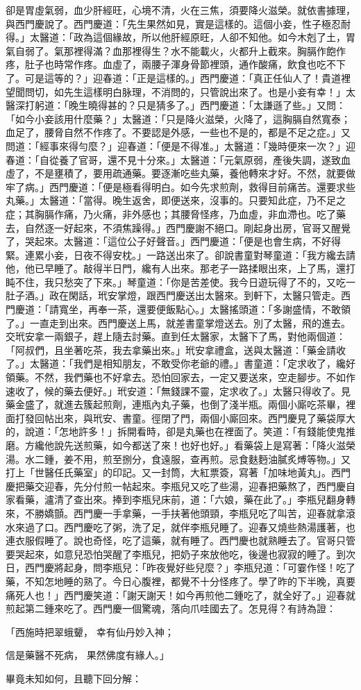 卻是胃虛氣弱，血少肝經旺，心境不清，火在三焦，須要降火滋榮。就依書據理，與西門慶說了。西門慶道：「先生果然如見，實是這樣的。這個小妾，性子極忍耐得。」太醫道：「政為這個緣故，所以他肝經原旺，人卻不知他。如今木剋了土，胃氣自弱了。氣那裡得滿？血那裡得生？水不能載火，火都升上截來。胸膈作飽作疼，肚子也時常作疼。血虛了，兩腰子渾身骨節裡頭，通作酸痛，飲食也吃不下了。可是這等的？」迎春道：「正是這樣的。」西門慶道：「真正任仙人了！貴道裡望聞問切，如先生這樣明白脉理，不消問的，只管說出來了。也是小妾有幸！」太醫深打躬道：「晚生曉得甚的？只是猜多了。」西門慶道：「太謙遜了些。」又問：「如今小妾該用什麼藥？」太醫道：「只是降火滋榮，火降了，這胸膈自然寬泰；血足了，腰脅自然不作疼了。不要認是外感，一些也不是的，都是不足之症。」又問道：「經事來得勻麼？」迎春道：「便是不得准。」太醫道：「幾時便來一次？」迎春道：「自從養了官哥，還不見十分來。」太醫道：「元氣原弱，產後失調，遂致血虛了，不是壅積了，要用疏通藥。要逐漸吃些丸藥，養他轉來才好。不然，就要做牢了病。」西門慶道：「便是極看得明白。如今先求煎劑，救得目前痛苦。還要求些丸藥。」太醫道：「當得。晚生返舍，即便送來，沒事的。只要知此症，乃不足之症；其胸膈作痛，乃火痛，非外感也；其腰脅怪疼，乃血虛，非血滯也。吃了藥去，自然逐一好起來，不須焦躁得。」西門慶謝不絕口。剛起身出房，官哥又醒覺了，哭起來。太醫道：「這位公子好聲音。」西門慶道：「便是也會生病，不好得緊。連累小妾，日夜不得安枕。」一路送出來了。卻說書童對琴童道：「我方纔去請他，他已早睡了。敲得半日門，纔有人出來。那老子一路揉眼出來，上了馬，還打盹不住，我只愁突了下來。」琴童道：「你是苦差使。我今日遊玩得了不的，又吃一肚子酒。」政在閑話，玳安掌燈，跟西門慶送出太醫來。到軒下，太醫只管走。西門慶道：「請寬坐，再奉一茶，還要便飯點心。」太醫搖頭道：「多謝盛情，不敢領了。」一直走到出來。西門慶送上馬，就差書童掌燈送去。別了太醫，飛的進去。交玳安拿一兩銀子，趕上隨去討藥。直到任太醫家，太醫下了馬，對他兩個道：「阿叔們，且坐著吃茶，我去拿藥出來。」玳安拿禮盒，送與太醫道：「藥金請收了。」太醫道：「我們是相知朋友，不敢受你老爺的禮。」書童道：「定求收了，纔好領藥。不然，我們藥也不好拿去。恐怕回家去，一定又要送來，空走腳步。不如作速收了，候的藥去便好。」玳安道：「無錢課不靈，定求收了。」太醫只得收了。見藥金盛了，就進去簇起煎劑，連瓶內丸子藥，也倒了淺半瓶。兩個小廝吃茶畢，裡面打發回帖出來，與玳安、書童。徑閉了門，兩個小廝回來。西門慶見了藥袋厚大的，說道：「怎地許多！」拆開看時，卻是丸藥也在裡面了。笑道：「有錢能使鬼推磨。方纔他說先送煎藥，如今都送了來！也好也好。」看藥袋上是寫著：「降火滋榮湯。水二鍾，姜不用，煎至捌分，食遠服，查再煎。忌食麩麪油膩炙煿等物。」又打上「世醫任氏藥室」的印記。又一封筒，大紅票簽，寫著「加味地黃丸」。西門慶把藥交迎春，先分付煎一帖起來。李瓶兒又吃了些湯，迎春把藥熬了，西門慶自家看藥，瀘清了查出來。捧到李瓶兒床前，道：「六娘，藥在此了。」李瓶兒翻身轉來，不勝嬌顫。西門慶一手拿藥，一手扶著他頭頸，李瓶兒吃了叫苦，迎春就拿滾水來過了口。西門慶吃了粥，洗了足，就伴李瓶兒睡了。迎春又燒些熱湯護著，也連衣服假睡了。說也奇怪，吃了這藥，就有睡了。西門慶也就熟睡去了。官哥只管要哭起來，如意兒恐怕哭醒了李瓶兒，把奶子來放他吃，後邊也寂寂的睡了。到次日，西門慶將起身，問李瓶兒：「昨夜覺好些兒麼？」李瓶兒道：「可霎作怪！吃了藥，不知怎地睡的熟了。今日心腹裡，都覺不十分怪疼了。學了昨的下半晚，真要痛死人也！」西門慶笑道：「謝天謝天！如今再煎他二鍾吃了，就全好了。」迎春就煎起第二鍾來吃了。西門慶一個驚魂，落向爪哇國去了。怎見得？有詩為證：

「西施時把翠蛾顰，  幸有仙丹妙入神；

信是藥醫不死病，  果然佛度有緣人。」

畢竟未知如何，且聽下回分解：
